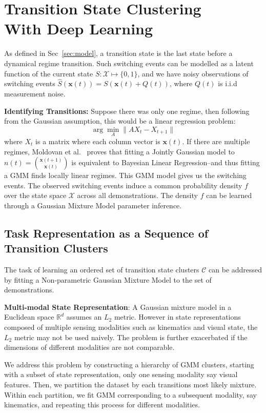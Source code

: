 \documentclass[0-main.tex]{subfiles}
\begin{document}
\section{Transition State Clustering \\ With Deep Learning}
\label{sec:vtsc}

As defined in Sec~\ref{sec:model}, a transition state is the last state before a dynamical regime transition. Such switching events can be modelled as a latent function of the current state $S:\mathcal{X}\mapsto \{0,1\}$, and we have noisy observations of switching events $\hat{S}(\mathbf{x}(t)) = S(\mathbf{x}(t)+Q(t))$, where $Q(t)$ is i.i.d measurement noise.

\noindent \textbf{Identifying Transitions: }
Suppose there was only one regime, then following from the Gaussian assumption, this would be a linear regression problem:
\[
\arg\min_A \|A X_t - X_{t+1}\|
\]
where $X_t$ is a matrix where each column vector is $\mathbf{x}(t)$.
If there are multiple regimes, Moldovan et al.~\cite{moldovan2013dirichlet} proves that fitting a Jointly Gaussian model to $n(t) = \binom{\mathbf{x}(t+1)}{\mathbf{x}(t)}$ is equivalent to Bayesian Linear Regression--and thus fitting a GMM finds locally linear regimes.
This GMM model gives us the switching events.
The observed switching events induce a common probability density $f$ over the state space $\mathcal{X}$ across all demonstrations. The density $f$ can be learned through a Gaussian Mixture Model parameter inference.

\subsection{Task Representation as a Sequence of Transition Clusters}
The task of learning an ordered set of transition state clusters $\mathcal{C}$ can be addressed by fitting a Non-parametric Gaussian Mixture Model to the set of demonstrations. 

\vspace{2pt}
\noindent \textbf{Multi-modal State Representation}: A Gaussian mixture model in a Euclidean space $\mathbb{R}^d$ assumes an $L_2$ metric. However in state representations composed of multiple sensing modalities such as kinematics and visual state, the $L_2$ metric may not be used naively. The problem is further exacerbated if the dimensions of different modalities are not comparable.

We address this problem by constructing a hierarchy of GMM clusters, starting with a subset of state representation, only one sensing modality say visual features. 
Then, we partition the dataset by each transitions most likely mixture.  
Within each partition, we fit GMM corresponding to a subsequent modality, say kinematics, and repeating this process for different modalities.
\end{document}

